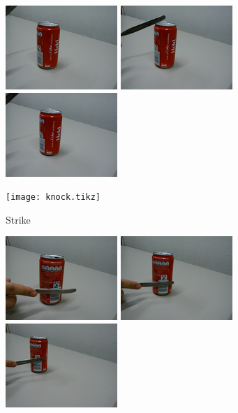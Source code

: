 \documentclass[letterpaper, 10 pt, conference]{ieeeconf}
\begin{document}
\begin{figure}[t]
  \centering
  \begin{subfigure}[b]{.8\linewidth}
    \centering
    \includegraphics[width=.25\linewidth]{knock0} \hspace{.4cm}
    \includegraphics[width=.25\linewidth]{knock1} \hspace{.4cm}
    \includegraphics[width=.25\linewidth]{knock2}

    \texttt{[image: knock.tikz]}
    \caption{Strike}
  \end{subfigure}

  \vspace{20pt}
  \begin{subfigure}[b]{.8\linewidth}
    \centering
    \includegraphics[width=.25\linewidth]{push0} \hspace{.4cm}
    \includegraphics[width=.25\linewidth]{push1} \hspace{.4cm}
    \includegraphics[width=.25\linewidth]{push2}


\end{subfigure}
\end{figure}
\end{document}
